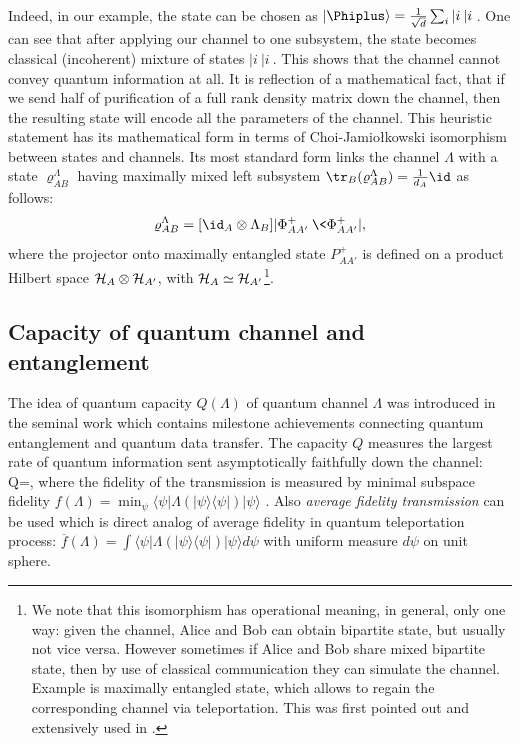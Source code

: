 \documentclass[rmp,12pt,preprint]{revtex4-2}
\begin{document}
Indeed, in our example, the state can be chosen as
$|\Phiplus\rangle={1\over \sqrt{d}}\sum_i |i\>|i\>$. One can see
that after applying our channel to one subsystem, the state becomes
classical (incoherent) mixture of states $|i\>|i\>$. This shows that
the channel cannot convey quantum information at all. It is
reflection of a mathematical fact, that if we send half of
purification of a full rank density matrix down the channel, then
the resulting state will encode all the parameters of the channel.
This heuristic statement has its mathematical form in terms of
Choi-Jamio\l{}kowski isomorphism between states and channels. Its
most standard form links the channel $\Lambda$ with a state
$\varrho_{AB}^{\Lambda}$ having maximally mixed left subsystem
${\tr}_{B}(\varrho_{AB}^{\Lambda})={1\over d_A}\id$ as follows:
\begin{equation}
\varrho_{AB}^{\Lambda}=[\id_{A} \otimes \Lambda_{B}]|\Phi^+_{AA'}\> \<\Phi^+_{AA'}|,
\label{StatesChannelsIsomorphism}
\end{equation}
where the projector onto maximally entangled state $P^{+}_{AA'}$ is defined on a
product Hilbert space ${\cal H}_{A} \otimes {\cal H}_{A'}$, with
${\cal H}_{A}\simeq{\cal H}_{A'}$\footnote{We note that this isomorphism has operational meaning, in general, only one way: given the channel,
Alice and Bob can obtain bipartite state, but usually not vice versa.
However sometimes if Alice and Bob share  mixed bipartite state, then by use of classical communication they can simulate the channel. Example is
maximally entangled state, which allows to regain
the corresponding channel via teleportation. This was first pointed out
and extensively used in \cite{BDSW1996}.}.

\subsection{Capacity of quantum channel and entanglement}
The idea of quantum capacity $Q(\Lambda)$ of quantum channel
$\Lambda$ was introduced in the seminal work \cite{BDSW1996} which
contains milestone achievements connecting quantum entanglement and
quantum data transfer. The capacity $Q$ measures the largest rate of
quantum information sent asymptotically faithfully down the channel:
\be Q=, \ee where the  fidelity of  the transmission is
measured by minimal subspace fidelity $f(\Lambda) = \min_{\psi}
\langle \psi|\Lambda(|\psi \rangle \langle \psi|)|\psi \rangle $
\cite{BennettDS97-cap}. Also {\it average fidelity transmission} can
be used which is direct analog of average fidelity in quantum
teleportation process:
$\overline{f}(\Lambda) = \int \langle \psi|\Lambda(|\psi
\rangle \langle \psi|)|\psi \rangle d \psi$
with uniform measure $d \psi$ on unit sphere.
\end{document}
